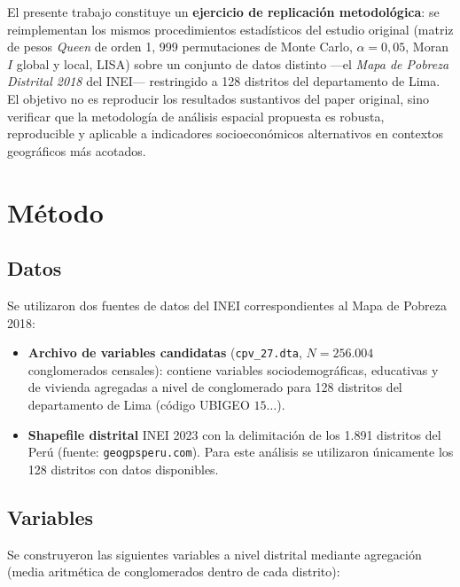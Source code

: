 \documentclass[12pt,a4paper]{article}
\begin{document}
El presente trabajo constituye un \textbf{ejercicio de replicación metodológica}: se reimplementan los mismos procedimientos estadísticos del estudio original (matriz de pesos \textit{Queen} de orden 1, 999 permutaciones de Monte Carlo, $\alpha = 0{,}05$, Moran $I$ global y local, LISA) sobre un conjunto de datos distinto —el \textit{Mapa de Pobreza Distrital 2018} del INEI— restringido a 128 distritos del departamento de Lima. El objetivo no es reproducir los resultados sustantivos del paper original, sino verificar que la metodología de análisis espacial propuesta es robusta, reproducible y aplicable a indicadores socioeconómicos alternativos en contextos geográficos más acotados.

\section{Método}

\subsection{Datos}

Se utilizaron dos fuentes de datos del INEI correspondientes al Mapa de Pobreza 2018:

\begin{itemize}
  \item \textbf{Archivo de variables candidatas} (\texttt{cpv\_27.dta}, $N = 256{.}004$ conglomerados censales): contiene variables sociodemográficas, educativas y de vivienda agregadas a nivel de conglomerado para 128 distritos del departamento de Lima (código UBIGEO $15\ldots$).
  \item \textbf{Shapefile distrital} INEI 2023 con la delimitación de los 1.891 distritos del Perú (fuente: \texttt{geogpsperu.com}). Para este análisis se utilizaron únicamente los 128 distritos con datos disponibles.
\end{itemize}

\subsection{Variables}

Se construyeron las siguientes variables a nivel distrital mediante agregación (media aritmética de conglomerados dentro de cada distrito):
\end{document}
